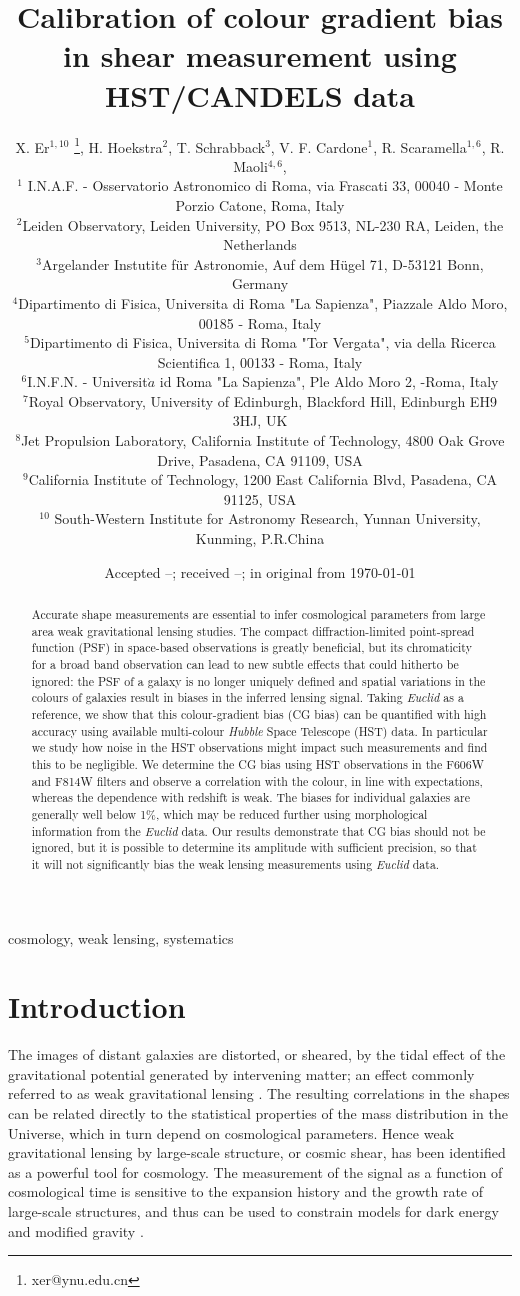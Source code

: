 \documentclass[useAMS,usenatbib]{mnras}
\title[Colour gradient bias]
{Calibration of colour gradient bias in shear measurement using HST/CANDELS data}
\author[X. Er et al.]%
{
X. Er$^{1,10}$ \thanks{xer@ynu.edu.cn},
H. Hoekstra$^2$, T. Schrabback$^3$, V. F. Cardone$^1$, R. Scaramella$^{1,6}$, R. Maoli$^{4,6}$,
\newauthor{M. Vicinanza$^{1,4,5}$, B. Gillis$^{6}$, J. Rhodes$^{7,8}$}
\\
$^1$ I.N.A.F. - Osservatorio Astronomico di Roma, via Frascati 33, 00040 - Monte Porzio Catone, Roma, Italy\\
$^2$Leiden Observatory, Leiden University, PO Box 9513, NL-230 RA, Leiden, the Netherlands \\
$^3$Argelander Instutite f\"ur Astronomie, Auf dem H\"ugel 71, D-53121 Bonn, Germany\\
$^4$Dipartimento di Fisica, Universita di Roma "La Sapienza", Piazzale Aldo Moro, 00185 - Roma, Italy\\
$^5$Dipartimento di Fisica, Universita di Roma "Tor Vergata", via della Ricerca Scientifica 1, 00133 - Roma, Italy\\
$^6$I.N.F.N. - Universit$\grave{a}$ id Roma "La Sapienza", Ple Aldo Moro 2, -Roma, Italy\\
$^7$Royal Observatory, University of Edinburgh, Blackford Hill, Edinburgh EH9 3HJ, UK\\
$^8$Jet Propulsion Laboratory, California Institute of Technology, 4800 Oak Grove Drive, Pasadena, CA 91109, USA\\
$^9$California Institute of Technology, 1200 East California Blvd, Pasadena, CA 91125, USA\\
$^{10}$ South-Western Institute for Astronomy Research, Yunnan University, Kunming, P.R.China
}
\date{Accepted --;  received --;  in original from \today}
\begin{document}
\maketitle

\begin{abstract}
Accurate shape measurements are essential to infer cosmological parameters from large area weak gravitational lensing studies. The compact diffraction-limited point-spread function (PSF) in space-based observations is greatly beneficial, but its chromaticity for a broad band observation can lead to new subtle effects that could hitherto be ignored: the PSF of a galaxy is no longer uniquely defined  and spatial variations in the colours of galaxies result in biases in the inferred lensing signal. Taking {\it Euclid} as a reference, we show that this colour-gradient bias (CG bias) can be quantified with high accuracy using available multi-colour {\it Hubble} Space Telescope (HST) data. In particular we study how noise in the HST observations might impact such measurements and find this to be negligible. We determine the CG bias using HST observations in the F606W and F814W filters and observe a correlation with the colour, in line with expectations, whereas the dependence with redshift is weak. The biases for individual galaxies are generally well below 1\%, which may be reduced further using morphological information from the {\it Euclid} data. Our results demonstrate that CG bias should not be ignored, but it is possible to determine its amplitude with sufficient precision, so that it will not significantly bias the weak lensing measurements using {\it Euclid} data.
\end{abstract}
\begin{keywords} cosmology, weak lensing, systematics
\end{keywords}


\section{Introduction}

The images of distant galaxies are distorted, or sheared, by the tidal effect of the gravitational  potential generated by intervening matter; an effect commonly referred to as weak gravitational lensing \citep[see e.g.][for a detailed introduction]{Bartelmann01}. The resulting correlations in the shapes can be related directly to the statistical properties of the mass distribution in the Universe, which in turn depend on cosmological parameters. Hence weak gravitational lensing by large-scale structure, or cosmic shear, has been identified as a powerful tool for cosmology. The measurement of the signal as a function of cosmological time is sensitive to the expansion history and the growth rate of large-scale structures, and thus can be used to constrain models for dark energy and modified gravity \citep{2016arXiv160600180A}.
\end{document}
